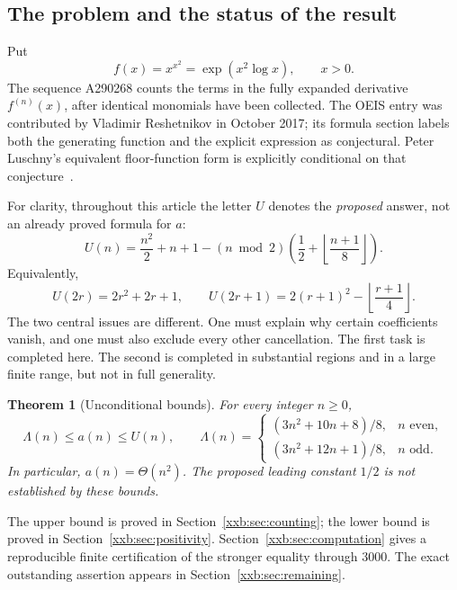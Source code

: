 \documentclass[11pt,a4paper]{article}
\numberwithin{equation}{section}
\newtheorem{theorem}{Theorem}[section]
\theoremstyle{definition}
\theoremstyle{remark}
\theoremstyle{plain}
\newcommand{\U}{U}
\begin{document}
\subsection{The problem and the status of the result}\label{xxb:sec:introduction}
Put
\[
 f(x)=x^{x^2}=\exp(x^2\log x),\qquad x>0.
\]
The sequence A290268 counts the terms in the fully expanded derivative
$f^{(n)}(x)$, after identical monomials have been collected. The OEIS entry
was contributed by Vladimir Reshetnikov in October 2017; its formula section
labels both the generating function and the explicit expression as
conjectural. Peter Luschny's equivalent floor-function form is explicitly
conditional on that conjecture~\cite{oeis290268}.

For clarity, throughout this article the letter $\U$ denotes the
\emph{proposed} answer, not an already proved formula for $a$:
\begin{equation}\label{xxb:eq:U}
 \U(n)=\frac{n^2}{2}+n+1
 -(n\bmod2)\left(\frac12+\left\lfloor\frac{n+1}{8}\right\rfloor\right).
\end{equation}
Equivalently,
\begin{equation}\label{xxb:eq:U-parity}
 \U(2r)=2r^2+2r+1,\qquad
 \U(2r+1)=2(r+1)^2-\left\lfloor\frac{r+1}{4}\right\rfloor.
\end{equation}
The two central issues are different. One must explain why certain
coefficients vanish, and one must also exclude every other cancellation.
The first task is completed here. The second is completed in substantial
regions and in a large finite range, but not in full generality.

\begin{theorem}[Unconditional bounds]\label{xxb:thm:main-bounds}
For every integer $n\ge0$,
\begin{equation}\label{xxb:eq:bounds}
 \Lambda(n)\le a(n)\le\U(n),
 \qquad
 \Lambda(n)=
 \begin{cases}
 (3n^2+10n+8)/8,&n\text{ even},\\[2pt]
 (3n^2+12n+1)/8,&n\text{ odd}.
 \end{cases}
\end{equation}
In particular, $a(n)=\Theta(n^2)$. The proposed leading constant $1/2$ is
not established by these bounds.
\end{theorem}

The upper bound is proved in Section~\ref{xxb:sec:counting}; the lower bound is
proved in Section~\ref{xxb:sec:positivity}. Section~\ref{xxb:sec:computation} gives a
reproducible finite certification of the stronger equality through $3000$.
The exact outstanding assertion appears in Section~\ref{xxb:sec:remaining}.
\end{document}
